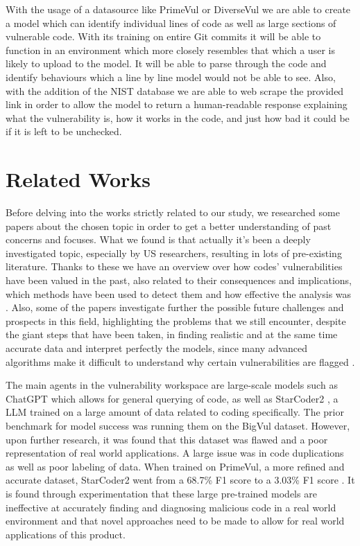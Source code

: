 \documentclass{article}
\begin{document}
With the usage of a datasource like PrimeVul or DiverseVul we are able to create a model which can identify individual lines of code as well as large sections of vulnerable code. With its training on entire Git commits it will be able to function in an environment which more closely resembles that which a user is likely to upload to the model. It will be able to parse through the code and identify behaviours which a line by line model would not be able to see. Also, with the addition of the NIST database we are able to web scrape the provided link in order to allow the model to return a human-readable response explaining what the vulnerability is, how it works in the code, and just how bad it could be if it is left to be unchecked. 

\section{Related Works}

Before delving into the works strictly related to our study, we researched some papers about the chosen topic in order to get a better understanding of past concerns and focuses. What we found is that actually it's been a deeply investigated topic, especially by US researchers, resulting in lots of pre-existing literature. Thanks to these we have an overview over how codes' vulnerabilities have been valued in the past, also related to their consequences and implications, which methods have been used to detect them and how effective the analysis was \cite{LIANG2025104098}. Also, some of the papers investigate further the possible future challenges and prospects in this field, highlighting the problems that we still encounter, despite the giant steps that have been taken, in finding realistic and at the same time accurate data and interpret perfectly the models, since many advanced algorithms make it difficult to understand why certain vulnerabilities are flagged \cite{harer2018automatedsoftwarevulnerabilitydetection}.

The main agents in the vulnerability workspace are large-scale models such as ChatGPT \cite{openai2024gpt4} which allows for general querying of code, as well as StarCoder2 \cite{lozhkov2024starcoder2stackv2}, a LLM trained on a large amount of data related to coding specifically. The prior benchmark for model success was running them on the BigVul dataset. However, upon further research, it was found that this dataset was flawed and a poor representation of real world applications. A large issue was in code duplications as well as poor labeling of data. When trained on PrimeVul, a more refined and accurate dataset, StarCoder2 went from a 68.7\% F1 score to a 3.03\% F1 score \cite{ding2024vulnerabilitydetectioncodelanguage}. It is found through experimentation that these large pre-trained models are ineffective at accurately finding and diagnosing malicious code in a real world environment and that novel approaches need to be made to allow for real world applications of this product. \cite{ding2024vulnerabilitydetectioncodelanguage}
\end{document}
